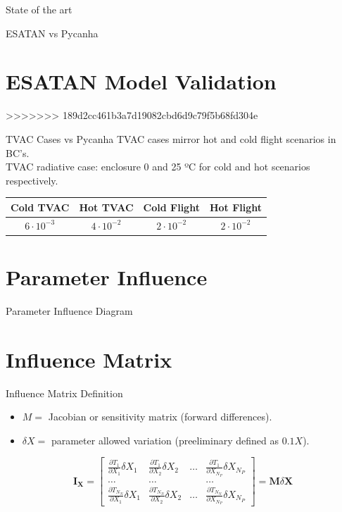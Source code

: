 \documentclass{cubeamer}
\begin{document}
\begin{frame}{State of the art}
\begin{minipage}{0.65\textwidth}
\begin{frame}{ESATAN vs Pycanha}
\section{ESATAN Model Validation}
>>>>>>> 189d2cc461b3a7d19082cbd6d9c79f5b68fd304e

\begin{frame}{TVAC Cases vs Pycanha}
TVAC cases mirror  hot and cold flight scenarios in BC's. \\
TVAC radiative case: enclosure 0 and 25 ºC for cold and hot scenarios respectively.
    \begin{center}
    \begin{tabular}{cccc}
    \toprule
    \textbf{Cold TVAC} & \textbf{Hot TVAC} & \textbf{Cold Flight} & \textbf{Hot Flight} \\
    \midrule
    $6\cdot 10^{-3}$ & $4\cdot 10^{-2}$ & $2\cdot 10^{-2}$ & $2\cdot 10^{-2}$ \\
    \bottomrule
    \end{tabular}
    \end{center}
\end{frame}

\section{Parameter Influence}

\begin{frame}{Parameter Influence Diagram}
    \begin{center}
    
    \end{center}
\end{frame}
\section{Influence Matrix}
\begin{frame}{ Influence Matrix Definition}
\begin{itemize}
    \item $M = $ Jacobian or sensitivity matrix (forward differences).
    \item $\delta X = $ parameter allowed variation (preeliminary defined as $0.1X$).
\end{itemize}
\begin{center}
\begin{equation}
\mathbf{I}_{\mathbf{X}}=\left[\begin{array}{cccc}
\frac{\partial T_1}{\partial X_1} \delta X_1 & \frac{\partial T_1}{\partial X_2} \delta X_2 & \ldots & \frac{\partial T_1}{\partial X_{N_P}} \delta X_{N_P} \\
\ldots & \ldots & & \ldots \\
\frac{\partial T_{N_N}}{\partial X_1} \delta X_1 & \frac{\partial T_{N_N}}{\partial X_2} \delta X_2 & \ldots & \frac{\partial T_{N_N}}{\partial X_{N_P}} \delta X_{N_P}
\end{array}\right]=\mathbf{M} \delta \boldsymbol{X}
\end{equation}


\end{center}
\end{frame}
\end{frame}
\end{minipage}
\end{frame}
\end{document}
